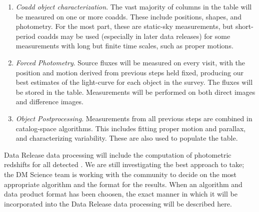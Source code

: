 \begin{enumerate}
catalogs\footnote{Note that \Sources are not considered when generating the \Object list (given the large
number of visits in each band, the false positives close to the faint end would increase the complexity of
association and deblending algorithms). It is possible for intermittent sources that are detected just above
the faint detection limit of single visits to be undetected in coaddds, and thus to not have a matching \Object.
To enable easy identification of such \Sources, the nearest \Object associated with each \Source, if any, will be recorded,
and some \Object measurements (e.g. stellar motion parameters) \emph{may} utilize positions from securely-matched \Sources.}.

    The deblender will make use of all information available at this stage, including the knowledge of peak positions, bands, time, time variability (from Prompt products), Galactic longitude and latitude, etc. The output of this stage is a list of uncharacterized \Objects\footnote{Depending on the exact implementation of the deblender, this stage may also attach significant metadata (eg, deblended footprints and pixel-weight maps) to each deblended \Object record.}.
    \item \emph{Coadd object characterization}.  The vast majority of columns in the \Object table will be measured on one or more coadds.  These include positions, shapes, and photometry.  For the most part, these are static-sky measurements, but short-period coadds may be used (especially in later data releases) for some measurements with long but finite time scales, such as proper motions.  
    \item \emph{Forced Photometry}. Source fluxes will be measured on every visit, with the position and motion derived from previous steps held fixed, producing our best estimates of the light-curve for each object in the survey. The fluxes will be stored in the \ForcedSource table.
    Measurements will be performed on both direct images and difference images.
    \item \emph{Object Postprocessing}.  Measurements from all previous steps are combined in catalog-space algorithms.  This includes fitting proper motion and parallax, and characterizing variability.  These are also used to populate the \Object table.
\end{enumerate}

Data Release data processing will include the computation of photometric redshifts for all detected \Objects. 
We are still investigating the best approach to take; the DM Science team is working with the community to decide on the most appropriate algorithm and the format for the results.  
When an algorithm and data product format has been choosen,  the exact manner in which it will be incorporated into the Data Release data processing will be described here.  

